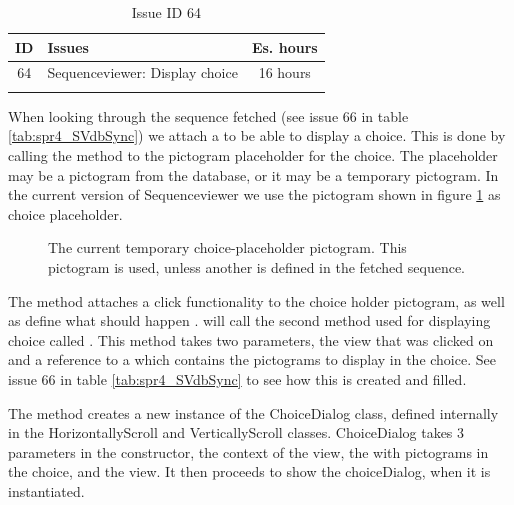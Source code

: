 \begin{longtable} { | c | p{12cm} | c | } 
\hline
	ID 	&	Issues	&		 Es. hours \\\hline
	 64	&	Sequenceviewer: Display choice	&	16 hours \\\hline
\caption{Issue ID 64}
\label{tab:spr4_SVdisplayChoice}
\end{longtable}

When looking through the sequence fetched (see issue 66 in table \ref{tab:spr4_SVdbSync}) we attach a  to be able to display a choice. This is done by calling the method  to the pictogram placeholder for the choice. The placeholder may be a pictogram from the database, or it may be a temporary pictogram. In the current version of Sequenceviewer we use the pictogram shown in figure \ref{fig:choiceplaceholder} as choice placeholder.

\begin{figure}[H]
	\centering
	\caption{The current temporary choice-placeholder pictogram. This pictogram is used, unless another is defined in the fetched sequence.}
	\label{fig:choiceplaceholder}
\end{figure}

The  method attaches a click functionality to the choice holder pictogram, as well as define what should happen .  will call the second method used for displaying choice called . This method takes two parameters, the view that was clicked on and a reference to a  which contains the pictograms to display in the choice. See issue 66 in table \ref{tab:spr4_SVdbSync} to see how this  is created and filled.

The  method creates a new instance of the ChoiceDialog class, defined internally in the HorizontallyScroll and VerticallyScroll classes. ChoiceDialog takes 3 parameters in the constructor, the context of the  view, the  with pictograms in the choice, and the  view. It then proceeds to show the choiceDialog, when it is instantiated.

